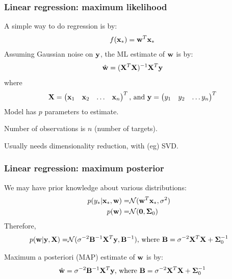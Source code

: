 \begin{frame}
\frametitle{Linear regression: maximum likelihood}
A simple way to do regression is by:
\begin{align*}
f({\bf x}_*) = {\bf w}^T {\bf x}_*
\end{align*}
Assuming Gaussian noise on ${\bf y}$, the ML estimate of ${\bf w}$ is by:
\begin{align*}
\hat{\bf w} = ({\bf X}^T{\bf X})^{-1}{\bf X}^T {\bf y}
\end{align*}
where
\begin{align*}
{\bf X} = \begin{pmatrix}{\bf x}_1 & {\bf x}_2 & \hdots & {\bf x}_n\end{pmatrix}^T \text{, and }
{\bf y} = \begin{pmatrix}y_1 & y_2 & \hdots y_n\end{pmatrix}^T
\end{align*}
Model has $p$ parameters to estimate.\par
Number of observations is $n$ (number of targets).\par
Usually needs dimensionality reduction, with (eg) SVD.
\end{frame}

\begin{frame}
\frametitle{Linear regression: maximum posterior}
We may have prior knowledge about various distributions:
\begin{align*}
p(y_* | {\bf x}_*, {\bf w}) = & \mathcal{N}({\bf w}^T{\bf x}_*, \sigma^2)\cr
p({\bf w}) = & \mathcal{N}({\bf 0},\boldsymbol\Sigma_0)\cr
\end{align*}
Therefore,
\begin{align*}
p({\bf w}|{\bf y},{\bf X})  = & \mathcal{N}(\sigma^{-2}{\bf B}^{-1}{\bf X}^T{\bf y},{\bf B}^{-1}) \text{, where } {\bf B} = \sigma^{-2}{\bf X}^T{\bf X} + \boldsymbol\Sigma_0^{-1}
\end{align*}

Maximum a posteriori (MAP) estimate of ${\bf w}$ is by:
\begin{align*}
\hat{\bf w} = \sigma^{-2}{\bf B}^{-1}{\bf X}^T{\bf y} \text{, where } {\bf B} = \sigma^{-2}{\bf X}^T{\bf X} + \boldsymbol\Sigma_0^{-1}
\end{align*}
\end{frame}

